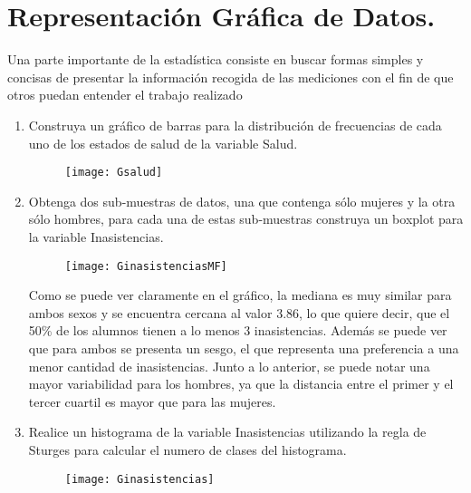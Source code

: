 \documentclass[12pt,letterpaper,hidelinks]{article}
\begin{document}
\pagebreak

\section{Representación Gráfica de Datos.}

Una parte importante de la estadística consiste en buscar formas simples y concisas de presentar la información recogida de las mediciones con el fin de que otros puedan entender el trabajo realizado

\begin{enumerate}[\hspace{.5cm} a)]

\item Construya un gráfico de barras para la distribución de frecuencias de cada uno de los estados de salud de la variable Salud.

\begin{figure}[h]
\centering
\texttt{[image: Gsalud]}
\label{img:Gsalud}
\end{figure}

\item Obtenga dos sub-muestras de datos, una que contenga sólo mujeres y la otra sólo hombres, para cada una de estas sub-muestras construya un boxplot para la variable Inasistencias.

\begin{figure}[h]
\centering
\texttt{[image: GinasistenciasMF]}
\label{img:Ginasistencias}
\end{figure}

Como se puede ver claramente en el gráfico, la mediana es muy similar para ambos sexos y se encuentra cercana al valor 3.86, lo que quiere decir, que el 50\% de los alumnos tienen a lo menos 3 inasistencias. Además se puede ver que para ambos se presenta un sesgo,  el que representa una preferencia a una menor cantidad de inasistencias. Junto a lo anterior, se puede notar una mayor variabilidad para los hombres, ya que la distancia entre el primer y el tercer cuartil es mayor que para las mujeres.

\item Realice un histograma de la variable Inasistencias utilizando la regla de Sturges para calcular el numero de clases del histograma.

\begin{figure}[h]
\centering
\texttt{[image: Ginasistencias]}
\label{img:Ginasistencias}
\end{figure}


\end{enumerate}
\end{document}
